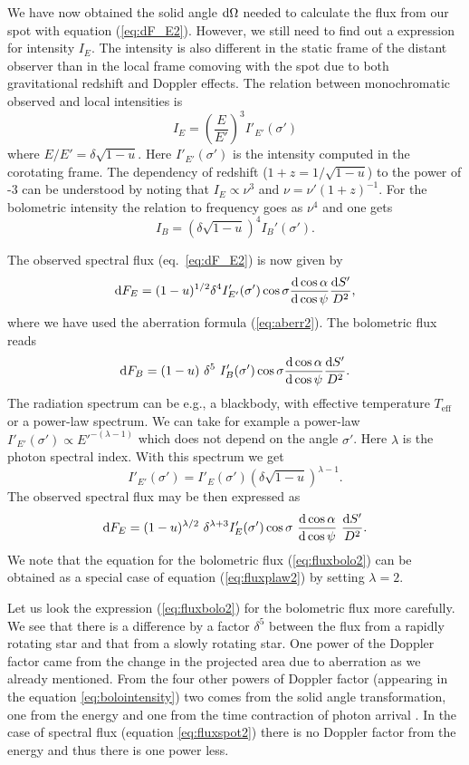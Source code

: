 \documentclass{wihuri}
\def\be{\begin{equation}}
\def\ee{\end{equation}}
\def\d{{\rm d}}
\def\Dop{\delta}
\begin{document}
We have now obtained the solid angle $\d\Omega$ needed to calculate the flux from our spot with equation (\ref{eq:dF_E2}). However, we still need to find out a expression for intensity $I_{E}$. The intensity is also different in the static frame of the distant observer than in the local frame comoving with the spot due to both gravitational redshift and Doppler effects. The relation between monochromatic observed and local intensities is \cite{mtw}\cite{rybicki}%
\be
I_{E} = \left (\frac{E}{E'}\right )^3 I'_{E '} (\sigma')
\ee
where $E/E'=\Dop \sqrt{1-u}$. Here $I'_{E'}(\sigma')$ is the intensity computed in the corotating frame. The dependency of redshift ($1+z = 1/\sqrt{1-u}$) to the power of -3 can be understood by noting that $I_{E} \propto \nu^{3}$ and $\nu = \nu'(1+z)^{-1}$.
For the bolometric intensity the relation to frequency goes as $\nu^{4}$ and one gets
\be \label{eq:bolointensity}
I_{B}= \left (\Dop \sqrt{1-u} \right )^4 I_{B}'(\sigma') .
\ee

The observed spectral flux (eq.~\ref{eq:dF_E2}) is now given by
\be \label{eq:fluxspot2}
\d F_{E}=(1-u)^{1/2} \Dop^{4} I'_{E'}(\sigma') \cos\sigma
\frac{\d \cos\alpha}{\d\cos\psi}
 \frac{\d S'}{D^2} ,
\ee
where we have used the aberration formula (\ref{eq:aberr2}).
The bolometric flux reads
\be  \label{eq:fluxbolo2}
\d F_{B}= (1-u)\ \Dop^5 \
I_{B}'(\sigma')  \cos\sigma \frac{\d\cos\alpha}{\d\cos\psi} \frac{\d S'}{D^2} .
\ee
The radiation spectrum can be e.g., a blackbody, with effective temperature $T_{\mathrm{eff}}$ or a power-law spectrum. We can take for example a power-law $I'_{E'}(\sigma') \propto E '^{-(\lambda-1)}$ which does not depend on the angle $\sigma'$. Here $\lambda$ is the photon spectral index. With this spectrum we get
\be \label{eq:int_trans2}
I'_{E'}(\sigma') = I'_{E}(\sigma')
\left( \Dop \sqrt{1-u} \right)^{\lambda-1} .
\ee
The observed spectral flux %
may be then expressed as
\be\label{eq:fluxplaw2}
\d F_{E}= (1-u)^{\lambda/2}\ \Dop^{\lambda+3} I'_E(\sigma')
\cos\sigma\ \frac{\d\cos\alpha}{\d\cos\psi}\ \frac{\d S'}{D^2}.
\ee
We note that the equation for the bolometric flux (\ref{eq:fluxbolo2})
can be obtained as a special case of equation (\ref{eq:fluxplaw2}) by setting $\lambda=2$. 

Let us look the expression (\ref{eq:fluxbolo2}) for the bolometric flux more carefully. We see that there is a difference by a factor $\Dop^5$ between the flux from a rapidly rotating star and that from a slowly rotating star. One power of the Doppler factor came from the change in the projected area due to aberration as we already mentioned. From the four other powers of Doppler factor (appearing in the equation \ref{eq:bolointensity}) two comes from the solid angle transformation, one from the energy and one from the time contraction of photon arrival \cite{rybicki}. %
In the case of spectral flux (equation \ref{eq:fluxspot2}) there is no Doppler factor from the energy and thus there is one power less.
\end{document}
